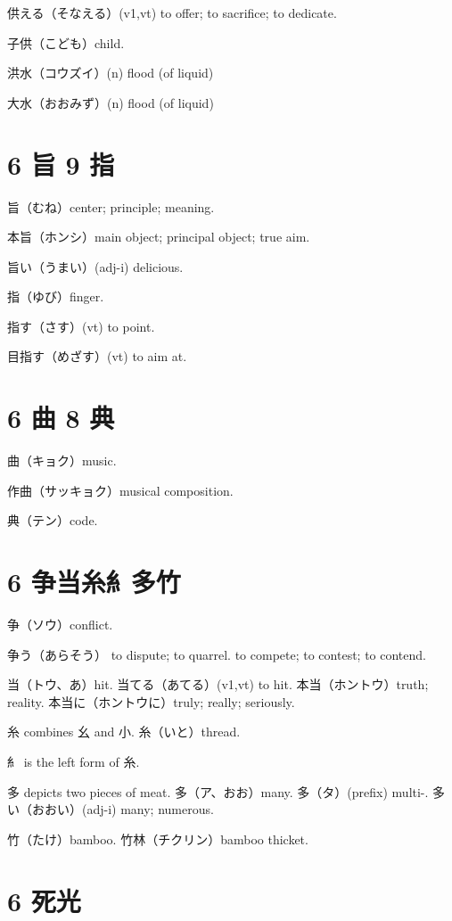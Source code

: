 供える（そなえる）(v1,vt) to offer; to sacrifice; to dedicate.

子供（こども）child.

洪水（コウズイ）(n) flood (of liquid)

大水（おおみず）(n) flood (of liquid)

\section{6 旨 9 指}

旨（むね）center; principle; meaning.

本旨（ホンシ）main object; principal object; true aim.

旨い（うまい）(adj-i) delicious.

指（ゆび）finger.

指す（さす）(vt) to point.

目指す（めざす）(vt) to aim at.

\section{6 曲 8 典}

曲（キョク）music.

作曲（サッキョク）musical composition.

典（テン）code.

\section{6 争当糸糹多竹}

争（ソウ）conflict.

争う（あらそう）
to dispute; to quarrel.
to compete; to contest; to contend.

当（トウ、あ）hit.
当てる（あてる）(v1,vt) to hit.
本当（ホントウ）truth; reality.
本当に（ホントウに）truly; really; seriously.

糸 combines 幺 and 小.
糸（いと）thread.

糹 is the left form of 糸.

多 depicts two pieces of meat.
多（ア、おお）many.
多（タ）(prefix) multi-.
多い（おおい）(adj-i) many; numerous.

竹（たけ）bamboo.
竹林（チクリン）bamboo thicket.

\section{6 死光}

